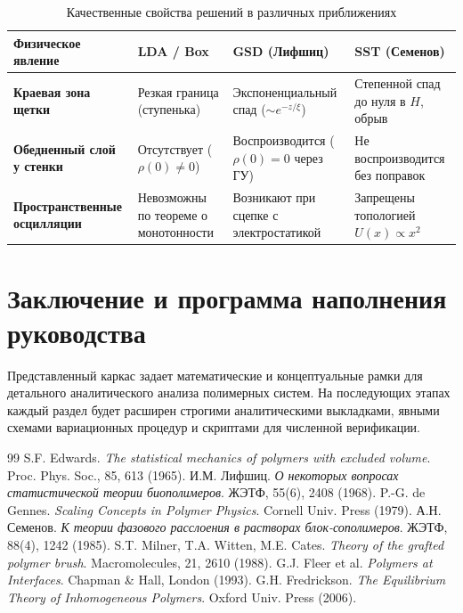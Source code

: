 \documentclass[12pt,a4paper]{article}
\begin{document}
\begin{table}[ht!]
\small
\centering
\caption{Качественные свойства решений в различных приближениях}
\label{tab:comparison}
\begin{tabularx}{\textwidth}{p{3.5cm} X X X}
\toprule
\textbf{Физическое явление} & \textbf{LDA / Box} & \textbf{GSD (Лифшиц)} & \textbf{SST (Семенов)} \\
\midrule
\textbf{Краевая зона щетки} & Резкая граница (ступенька) & Экспоненциальный спад ($\sim e^{-z/\xi}$) & Степенной спад до нуля в $H$, обрыв \\
\addlinespace
\textbf{Обедненный слой у стенки} & Отсутствует ($\rho(0) \neq 0$) & Воспроизводится ($\rho(0) = 0$ через ГУ) & Не воспроизводится без поправок \\
\addlinespace
\textbf{Пространственные осцилляции} & Невозможны по теореме о монотонности & Возникают при сцепке с электростатикой & Запрещены топологией $U(x) \propto x^2$ \\
\bottomrule
\end{tabularx}
\end{table}

\section{Заключение и программа наполнения руководства}

Представленный каркас задает математические и концептуальные рамки для детального аналитического анализа полимерных систем. На последующих этапах каждый раздел будет расширен строгими аналитическими выкладками, явными схемами вариационных процедур и скриптами для численной верификации.

\begin{thebibliography}{99}
 S.F. Edwards. \textit{The statistical mechanics of polymers with excluded volume}. Proc. Phys. Soc., 85, 613 (1965).
 И.М. Лифшиц. \textit{О некоторых вопросах статистической теории биополимеров}. ЖЭТФ, 55(6), 2408 (1968).
 P.-G. de Gennes. \textit{Scaling Concepts in Polymer Physics}. Cornell Univ. Press (1979).
 А.Н. Семенов. \textit{К теории фазового расслоения в растворах блок-сополимеров}. ЖЭТФ, 88(4), 1242 (1985).
 S.T. Milner, T.A. Witten, M.E. Cates. \textit{Theory of the grafted polymer brush}. Macromolecules, 21, 2610 (1988).
 G.J. Fleer et al. \textit{Polymers at Interfaces}. Chapman \& Hall, London (1993).
 G.H. Fredrickson. \textit{The Equilibrium Theory of Inhomogeneous Polymers}. Oxford Univ. Press (2006).
\end{thebibliography}
\end{document}
